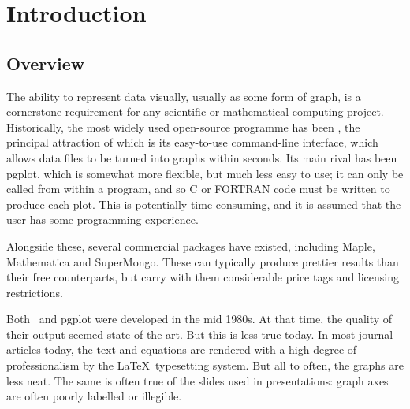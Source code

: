 %
%
%
%
%



\chapter{Introduction}

\label{introduction}

\section{Overview}

The ability to represent data visually, usually as some form of graph, is a
cornerstone requirement for any scientific or mathematical computing project.
Historically, the most widely used open-source programme has been {\sc
\gnuplot}, the principal attraction of which is its easy-to-use
command-line interface, which allows data files to be turned into graphs within
seconds. Its main rival has been {\sc pgplot}, which is somewhat
more flexible, but much less easy to use; it can only be called from within a
program, and so C or FORTRAN code must be written to produce each plot. This is
potentially time consuming, and it is assumed that the user has some
programming experience.

Alongside these, several commercial packages have existed, including {\sc
Maple}, {\sc Mathematica} and {\sc
SuperMongo}.  These can typically produce prettier results
than their free counterparts, but carry with them considerable price tags and
licensing restrictions.

Both \gnuplot\ and pgplot were developed in the mid 1980s. At that time, the
quality of their output seemed state-of-the-art. But this is less true today.
In most journal articles today, the text and equations are rendered with a high
degree of professionalism by the \LaTeX\ typesetting system. But all to often,
the graphs are less neat.  The same is often true of the slides used in
presentations: graph axes are often poorly labelled or illegible.

